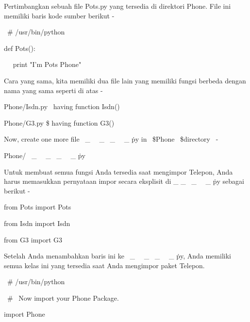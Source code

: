 \noindent 
Pertimbangkan sebuah file Pots.py yang tersedia di direktori Phone. File ini memiliki baris kode sumber berikut - \par
\noindent 
 \hspace*{0.5in}  \  \#  \!/usr/bin/python \par
\vspace{12pt}
\noindent 
 \hspace*{0.5in} def Pots(): \par
\noindent 
 \hspace*{0.5in} ~~ print "I'm Pots Phone" \par
\noindent 
Cara yang sama, kita memiliki dua file lain yang memiliki fungsi berbeda dengan nama yang sama seperti di atas - \par
\noindent 
Phone/Isdn.py \  \file having function Isdn() \par
\noindent 
Phone/G3.py \$  \file having function G3() \par
\vspace{12pt}
\noindent 
Now, create one more file  \  \_  \ \  \_  \init \  \_  \ \  \_  \.py in \  \$Phone \  \$directory  \ - \ \par
\noindent 
Phone/ \  \_  \ \  \_  \init \  \_  \ \  \_  \.py \par
\noindent 
Untuk membuat semua fungsi Anda tersedia saat mengimpor Telepon, Anda harus memasukkan pernyataan impor secara eksplisit di    \_     \_  \init \  \_  \ \  \_  \.py sebagai berikut - \par
\noindent 
 \hspace*{0.5in} from Pots import Pots \par
\noindent 
 \hspace*{0.5in} from Isdn import Isdn \par
\noindent 
 \hspace*{0.5in} from G3 import G3 \par
\vspace{12pt}
\noindent 
Setelah Anda menambahkan baris ini ke  \  \_  \ \  \_  \init \  \_  \ \  \_  \.py, Anda memiliki semua kelas ini yang tersedia saat Anda mengimpor paket Telepon. \par
\noindent 
 \hspace*{0.5in}  \  \#  \!/usr/bin/python \par
\vspace{12pt}
\noindent 
 \hspace*{0.5in}  \  \#  \ Now import your Phone Package. \par
\noindent 
 \hspace*{0.5in} import Phone \par
